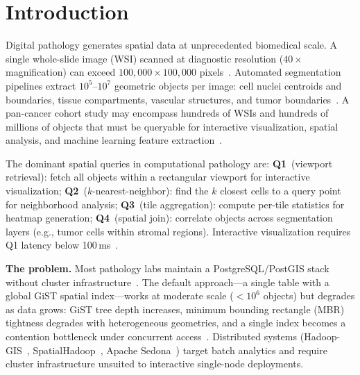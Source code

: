 \documentclass[sigconf]{acmart}
\begin{document}
\maketitle

\section{Introduction}
\label{sec:intro}

Digital pathology generates spatial data at unprecedented biomedical scale.
A single whole-slide image (WSI) scanned at diagnostic resolution ($40\times$ magnification) can exceed $100{,}000 \times 100{,}000$ pixels~\cite{wang2014high,saltz2018spatial}.
Automated segmentation pipelines extract $10^5$--$10^7$ geometric objects per image: cell nuclei centroids and boundaries, tissue compartments, vascular structures, and tumor boundaries~\cite{aji2013hadoop,graham2019hover,gamper2020pannuke}.
A pan-cancer cohort study may encompass hundreds of WSIs and hundreds of millions of objects that must be queryable for interactive visualization, spatial analysis, and machine learning feature extraction~\cite{lu2021data,chen2024uni}.

The dominant spatial queries in computational pathology are:
\textbf{Q1}~(viewport retrieval): fetch all objects within a rectangular viewport for interactive visualization;
\textbf{Q2}~($k$-nearest-neighbor): find the $k$ closest cells to a query point for neighborhood analysis;
\textbf{Q3}~(tile aggregation): compute per-tile statistics for heatmap generation;
\textbf{Q4}~(spatial join): correlate objects across segmentation layers (e.g., tumor cells within stromal regions).
Interactive visualization requires Q1 latency below 100\,ms~\cite{shneiderman1984response,liu2014effects}.

\textbf{The problem.}
Most pathology labs maintain a PostgreSQL/PostGIS stack without cluster infrastructure~\cite{wang2011pais,postgis2023}.
The default approach---a single table with a global GiST spatial index---works at moderate scale ($< 10^6$ objects) but degrades as data grows: GiST tree depth increases, minimum bounding rectangle (MBR) tightness degrades with heterogeneous geometries, and a single index becomes a contention bottleneck under concurrent access~\cite{guttman1984r,arge2004optimal}.
Distributed systems (Hadoop-GIS~\cite{aji2013hadoop}, SpatialHadoop~\cite{eldawy2015spatialhadoop}, Apache Sedona~\cite{sedona2021}) target batch analytics and require cluster infrastructure unsuited to interactive single-node deployments.
\end{document}
